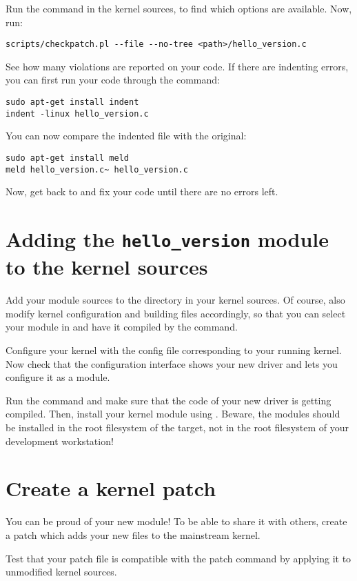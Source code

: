 Run the  command in the kernel sources,
to find which options are available.  Now, run:

\begin{verbatim}
scripts/checkpatch.pl --file --no-tree <path>/hello_version.c
\end{verbatim}

See how many violations are reported on your code. If there are
indenting errors, you can first run your code through the 
command:

\begin{verbatim}
sudo apt-get install indent
indent -linux hello_version.c
\end{verbatim}

You can now compare the indented file with the original:

\begin{verbatim}
sudo apt-get install meld
meld hello_version.c~ hello_version.c
\end{verbatim}

Now, get back to  and fix your code until there are
no errors left.

\section{Adding the {\tt hello\_version} module to the kernel sources}

Add your module sources to the  directory in your
kernel sources. Of course, also modify kernel configuration and
building files accordingly, so that you can select your module in
 and have it compiled by the  command.

Configure your kernel with the config file corresponding to your
running kernel. Now check that the configuration interface shows your
new driver and lets you configure it as a module.

Run the  command and make sure that the code of your new
driver is getting compiled. Then, install your kernel module using
. Beware, the modules should be installed
in the root filesystem of the target, not in the root filesystem of
your development workstation!

\section{Create a kernel patch}

You can be proud of your new module! To be able to share it with
others, create a patch which adds your new files to the mainstream
kernel.

Test that your patch file is compatible with the patch command by
applying it to unmodified kernel sources.
